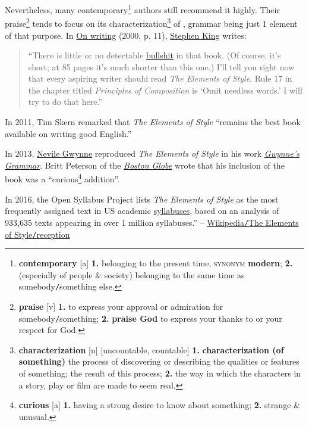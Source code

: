 \documentclass[oneside]{book}
\numberwithin{equation}{section}
\begin{document}
Nevertheless, many contemporary\footnote{\textbf{contemporary} [a] \textbf{1.} belonging to the present time, \textsc{synonym} \textbf{modern}; \textbf{2.} (especially of people \& society) belonging to the same time as somebody\texttt{/}something else.} authors still recommend it highly. Their praise\footnote{\textbf{praise} [v] \textbf{1.} to express your approval or admiration for somebody\texttt{/}something; \textbf{2.} \textbf{praise God} to express your thanks to or your respect for God.} tends to focus on its characterization\footnote{\textbf{characterization} [n] [uncountable, countable] \textbf{1.} \textbf{characterization (of something)} the process of discovering or describing the qualities or features of something; the result of this process; \textbf{2.} the way in which the characters in a story, play or film are made to seem real.} of , grammar being just 1 element of that purpose. In \href{https://en.wikipedia.org/wiki/On_Writing:_A_Memoir_of_the_Craft}{On writing} (2000, p. 11), \href{https://en.wikipedia.org/wiki/Stephen_King}{Stephen King} writes:
\begin{quotation}
	``There is little or no detectable \href{https://en.wikipedia.org/wiki/Bullshit}{bullshit} in that book. (Of course, it's short; at 85 pages it's much shorter than this one.) I'll tell you right now that every aspiring writer should read \textit{The Elements of Style}. Rule 17 in the chapter titled \textit{Principles of Composition} is `Omit needless words.' I will try to do that here.''
\end{quotation}
In 2011, Tim Skern remarked that \textit{The Elements of Style} ``remains the best book available on writing good English.''

In 2013, \href{https://en.wikipedia.org/wiki/Nevile_Gwynne}{Nevile Gwynne} reproduced \textit{The Elements of Style} in his work \href{https://en.wikipedia.org/wiki/Gwynne%27s_Grammar}{\textit{Gwynne's Grammar}}. Britt Peterson of the \href{https://en.wikipedia.org/wiki/Boston_Globe}{\textit{Boston Globe}} wrote that his inclusion of the book was a ``curious\footnote{\textbf{curious} [a] \textbf{1.} having a strong desire to know about something; \textbf{2.} strange \& unusual.} addition''.

In 2016, the Open Syllabus Project lists \textit{The Elements of Style} as the most frequently assigned text in US academic \href{https://en.wikipedia.org/wiki/Syllabus}{syllabuses}, based on an analysis of 933,635 texts appearing in over 1 million syllabuses.'' -- \href{https://en.wikipedia.org/wiki/The_Elements_of_Style#Reception}{Wikipedia\texttt{/}The Elements of Style\texttt{/}reception}
\end{document}
